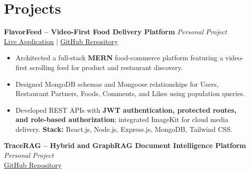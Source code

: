 \documentclass[a4paper,10pt]{article}
\newcommand{\projectHeading}[3]{
  \textbf{#1} \hfill \textit{#2}\\
  #3\\[-3pt]
}
\begin{document}

\section{Projects}

\projectHeading
  {FlavorFeed -- Video-First Food Delivery Platform}
  {Personal Project}
  {\href{https://flavour-feed-latest.vercel.app/}{Live Application}
  \;|\;
  \href{https://github.com/ayushsotechy/ZomatoClone.git}{GitHub Repository}}

\begin{itemize}
  \item Architected a full-stack \textbf{MERN} food-commerce platform featuring
  a video-first scrolling feed for product and restaurant discovery.

  \item Designed MongoDB schemas and Mongoose relationships for Users,
  Restaurant Partners, Foods, Comments, and Likes using population queries.

  \item Developed REST APIs with \textbf{JWT authentication, protected routes,
  and role-based authorization}; integrated ImageKit for cloud media delivery.
  \textbf{Stack:} React.js, Node.js, Express.js, MongoDB, Tailwind CSS.
\end{itemize}

\vspace{2pt}

\projectHeading
  {TraceRAG -- Hybrid and GraphRAG Document Intelligence Platform}
  {Personal Project}
  {\href{https://github.com/ayushsotechy/TraceRAG}{GitHub Repository}}
\end{document}
